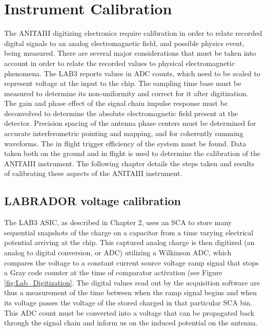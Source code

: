 	
\chapter{Instrument Calibration}

	The ANITAIII digitizing electronics require calibration in order to relate recorded digital signals to an analog electromagnetic field, and possible physics event, being measured.  There are several major considerations that must be taken into account in order to relate the recorded values to physical electromagnetic phenomena.  The LAB3 reports values in ADC counts, which need to be scaled to represent voltage at the input to the chip.  The sampling time base must be measured to determine its non-uniformity and correct for it after digitization.  The gain and phase effect of the signal chain impulse response must be deconvolved to determine the absolute electromagnetic field present at the detector.  Precision spacing of the antenna phase centers must be determined for accurate interferometric pointing and mapping, and for coherently summing waveforms. The in flight trigger efficiency of the system must be found. Data taken both on the ground and in flight is used to determine the calibration of the ANITAIII instrument. The following chapter details the steps taken and results of calibrating these aspects of the ANITAIII instrument.
	

	
\section{LABRADOR voltage calibration}
		The LAB3 ASIC, as described in Chapter 2, uses an SCA to store many sequential snapshots of the charge on a capacitor from a time varying electrical potential arriving at the chip.  This captured analog charge is then digitized (an analog to digital conversion, or ADC) utilizing a Wilkinson ADC, which compares the voltage to a constant current source voltage ramp signal that stops a Gray code counter at the time of comparator activation (see Figure \ref{fig:Lab_Digitization}.  The digital values read out by the acquisition software are thus a measurement of the time between when the ramp signal begins and when its voltage passes the voltage of the stored charged in that particular SCA bin.  This ADC count must be converted into a voltage that can be propagated back through the signal chain and inform us on the induced potential on the antenna.

